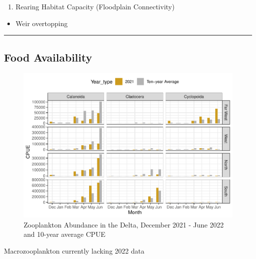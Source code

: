 \documentclass[
]{book}
\providecommand{\tightlist}{%
  \setlength{\itemsep}{0pt}\setlength{\parskip}{0pt}}
\theoremstyle{definition}
\theoremstyle{definition}
\theoremstyle{definition}
\theoremstyle{definition}
\theoremstyle{remark}
\begin{document}
\begin{enumerate}
\def\labelenumi{\arabic{enumi}.}
\tightlist
\item
  Rearing Habitat Capacity (Floodplain Connectivity)
\end{enumerate}

\begin{itemize}
\tightlist
\item
  Weir overtopping
\end{itemize}

\begin{center}\rule{0.5\linewidth}{0.5pt}\end{center}

\hypertarget{food-availability}{%
\subsection{Food Availability}\label{food-availability}}

\begin{figure}
\centering
\includegraphics{_main_files/figure-latex/meso-fig-1.pdf}
\caption{\label{fig:meso-fig}Zooplankton Abundance in the Delta, December 2021 - June 2022 and 10-year average CPUE}
\end{figure}

Macrozooplankton currently lacking 2022 data
\end{document}
